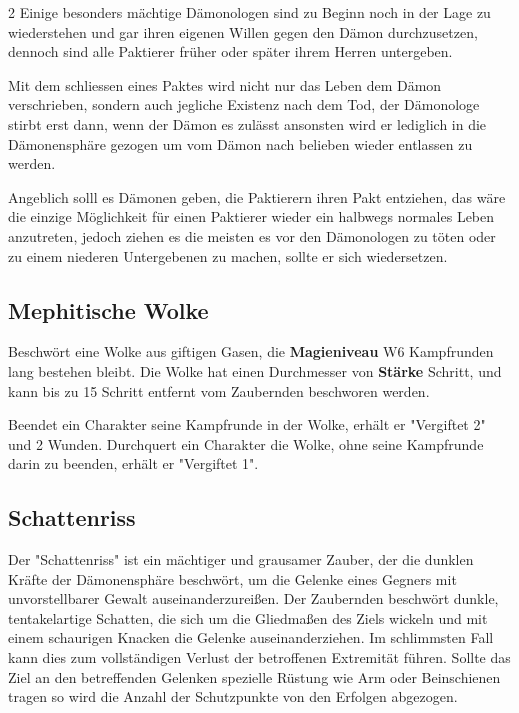 \begin{multicols*}{2}
Einige besonders mächtige Dämonologen sind zu Beginn noch in der Lage zu wiederstehen und gar ihren eigenen Willen gegen den Dämon durchzusetzen, dennoch sind alle Paktierer früher oder später ihrem Herren untergeben.

Mit dem schliessen eines Paktes wird nicht nur das Leben dem Dämon verschrieben, sondern auch jegliche Existenz nach dem Tod, der Dämonologe stirbt erst dann, wenn der Dämon es zulässt ansonsten wird er lediglich in die Dämonensphäre gezogen um vom Dämon nach belieben wieder entlassen zu werden.

Angeblich solll es Dämonen geben, die Paktierern ihren Pakt entziehen, das wäre die einzige Möglichkeit für einen Paktierer wieder ein halbwegs normales Leben anzutreten, jedoch ziehen es die meisten es vor den Dämonologen zu töten oder zu einem niederen Untergebenen zu machen, sollte er sich wiedersetzen.



\subsection{Mephitische Wolke}

Beschwört eine Wolke aus giftigen Gasen, die \textbf{Magieniveau} W6 Kampfrunden lang bestehen bleibt. Die Wolke hat einen Durchmesser von \textbf{Stärke} Schritt, und kann bis zu 15 Schritt entfernt vom Zaubernden beschworen werden.

Beendet ein Charakter seine Kampfrunde in der Wolke, erhält er "Vergiftet 2" und 2 Wunden. Durchquert ein Charakter die Wolke, ohne seine Kampfrunde darin zu beenden, erhält er "Vergiftet 1".



\subsection{Schattenriss}

Der "Schattenriss" ist ein mächtiger und grausamer Zauber, der die dunklen Kräfte der Dämonensphäre beschwört, um die Gelenke eines Gegners mit unvorstellbarer Gewalt auseinanderzureißen. Der Zaubernden beschwört dunkle, tentakelartige Schatten, die sich um die Gliedmaßen des Ziels wickeln und mit einem schaurigen Knacken die Gelenke auseinanderziehen. Im schlimmsten Fall kann dies zum vollständigen Verlust der betroffenen Extremität führen. Sollte das Ziel an den betreffenden Gelenken spezielle Rüstung wie Arm oder Beinschienen tragen so wird die Anzahl der Schutzpunkte von den Erfolgen abgezogen.


\end{multicols*}

